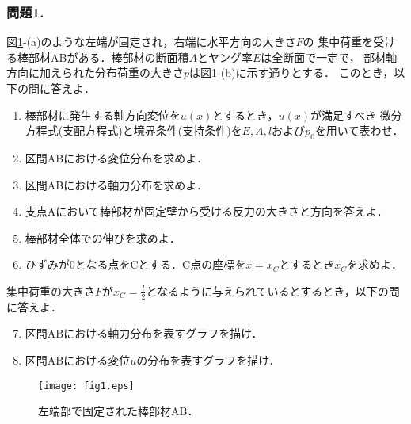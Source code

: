 \documentclass[10pt,a4j]{jarticle}
\begin{document}
\subsubsection*{問題1.}
図\ref{fig:fig1}-(a)のような左端が固定され，右端に水平方向の大きさ$F$の
集中荷重を受ける棒部材ABがある．棒部材の断面積$A$とヤング率$E$は全断面で一定で，
部材軸方向に加えられた分布荷重の大きさ$p$は図\ref{fig:fig1}-(b)に示す通りとする．
このとき，以下の問に答えよ．
\begin{enumerate}
\item
	棒部材に発生する軸方向変位を$u(x)$とするとき，$u(x)$が満足すべき
	微分方程式(支配方程式)と境界条件(支持条件)を$E, A, l$および$p_0$を用いて表わせ．
\item
	区間ABにおける変位分布を求めよ．
\item	
	区間ABにおける軸力分布を求めよ．
\item	
	支点Aにおいて棒部材が固定壁から受ける反力の大きさと方向を答えよ．
\item
	棒部材全体での伸びを求めよ．
\item
	ひずみが0となる点をCとする．C点の座標を$x=x_C$とするとき$x_C$を求めよ．
\end{enumerate}
集中荷重の大きさ$F$が$x_C=\frac{l}{2}$となるように与えられているとするとき，以下の問に答えよ．
\begin{enumerate}
\setcounter{enumi}{6}
\item
	区間ABにおける軸力分布を表すグラフを描け．
\item
	区間ABにおける変位$u$の分布を表すグラフを描け．
\end{enumerate}
\begin{figure}[h]
	\begin{center}
	\texttt{[image: fig1.eps]} 
	\end{center}
	\caption{左端部で固定された棒部材AB．}
	\label{fig:fig1}
\end{figure}
\newpage
\end{document}
